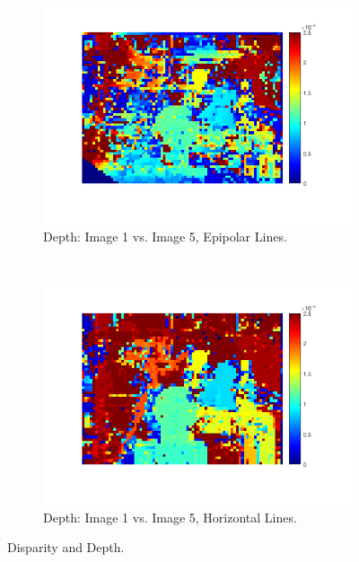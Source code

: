 \documentclass[a4paper, 10pt, conference]{ieeeconf}
\begin{document}
\begin{figure}[!ht]
\begin{subfigure}{0.45\linewidth}
        \includegraphics[width=\linewidth]{pic/q2_2_c1_depth}
      \caption{Depth: Image 1  vs. Image 5, Epipolar Lines.}
    \end{subfigure}
    ~
    \begin{subfigure}{0.45\linewidth}
        \includegraphics[width=\linewidth]{pic/q2_2_c2_depth}
        \caption{Depth: Image 1  vs. Image 5, Horizontal Lines.}
    \end{subfigure}

	\caption{Disparity and Depth.}
\end{figure}


\newpage
\end{document}
